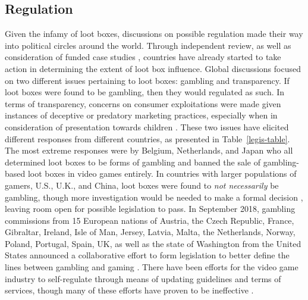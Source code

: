 \documentclass[11pt]{article}
\newcommand\genref[2]{#1~\ref{#2}}
\newcommand\tblref[1]{\genref{Table}{#1}}
\begin{document}
\newpage
\subsection{Regulation}\label{lootbox-law-sect}
Given the infamy of loot boxes, discussions on possible regulation made 
their way into political circles around the world. Through independent review,
as well as consideration of funded case studies \cite{McCaffrey2019}, countries have 
already started to take action in determining the extent of loot box influence. 
Global discussions focused on two different issues pertaining to loot boxes: 
gambling and transparency. If loot boxes were found to be gambling, then they would 
regulated as such. In terms of transparency, concerns on consumer exploitations 
were made given instances of deceptive or predatory marketing practices, especially 
when in consideration of presentation towards children \cite{McCaffrey2019}.
These two issues have elicited different responses from different countries,
as presented in \tblref{legis-table}. The most extreme responses were by Belgium, Netherlands, 
and Japan who all determined loot boxes to be forms of gambling and banned 
the sale of gambling-based loot boxes in video games entirely. In countries with larger
populations of gamers, U.S., U.K., and China, loot boxes were found to
\textit{not necessarily} be gambling, though more investigation would be 
needed to make a formal decision \cite{McCaffrey2019}, 
leaving room open for possible legislation to pass.
In September 2018, gambling commissions from 15 European nations of 
Austria, the Czech Republic, France, Gibraltar, Ireland, Isle of Man, Jersey, Latvia, 
Malta, the Netherlands, Norway, Poland, Portugal, Spain, UK, 
as well as the state of Washington from the United States announced a 
collaborative effort to form legislation to better define the lines between
gambling and gaming \cite{kent_2018}. There have been efforts
for the video game industry to self-regulate through means of
updating guidelines and terms of services, though many of these
efforts have proven to be ineffective \cite{McCaffrey2019}.
\end{document}
